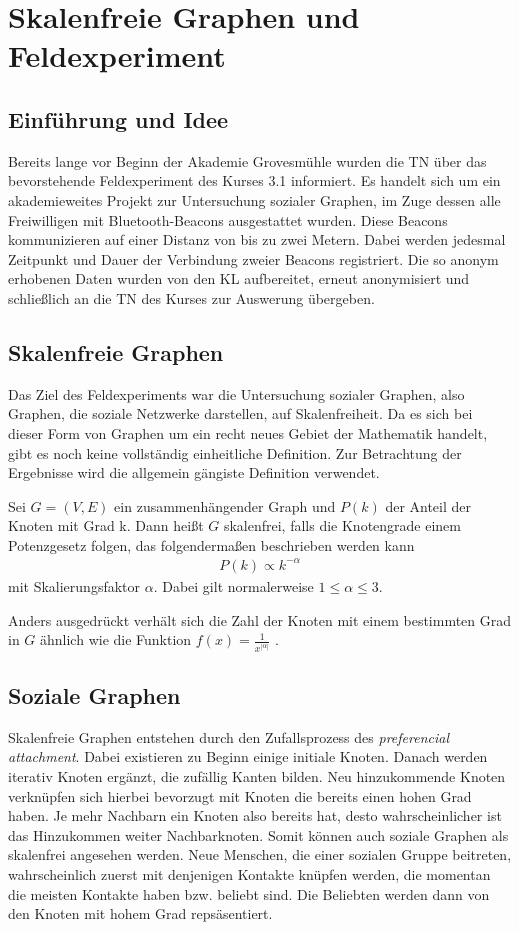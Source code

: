 \section{Skalenfreie Graphen und Feldexperiment}
\subsection{Einführung und Idee}
Bereits lange vor Beginn der Akademie Grovesmühle wurden die TN über das bevorstehende Feldexperiment des Kurses 3.1 informiert. Es handelt sich um ein akademieweites Projekt zur Untersuchung sozialer Graphen, im Zuge dessen alle Freiwilligen mit Bluetooth-Beacons ausgestattet wurden. Diese Beacons kommunizieren auf einer Distanz von bis zu zwei Metern. Dabei werden jedesmal Zeitpunkt und Dauer der Verbindung zweier Beacons registriert. Die so anonym erhobenen Daten wurden von den KL aufbereitet, erneut anonymisiert und schließlich an die TN des Kurses zur Auswerung übergeben.
\subsection{Skalenfreie Graphen}
Das Ziel des Feldexperiments war die Untersuchung sozialer Graphen, also Graphen, die soziale Netzwerke darstellen, auf Skalenfreiheit. Da es sich bei dieser Form von Graphen um ein recht neues Gebiet der Mathematik handelt, gibt es noch keine vollständig einheitliche Definition. Zur Betrachtung der Ergebnisse wird die allgemein gängiste Definition verwendet.
\begin{df} Sei $G=(V,E)$ ein zusammenhängender Graph und $P(k)$ der Anteil der Knoten mit Grad k. Dann heißt $G$ skalenfrei, falls die Knotengrade einem Potenzgesetz folgen, das folgendermaßen beschrieben werden kann
\begin{align*}
P(k) \varpropto k^{-\alpha}
\end{align*}
mit Skalierungsfaktor $\alpha$. Dabei gilt normalerweise $1\leq\alpha\leq3$.
\end{df}
Anders ausgedrückt verhält sich die Zahl der Knoten mit einem bestimmten Grad in $G$ ähnlich wie die Funktion $f(x) = \frac{1}{x^{|\alpha|}}$ .
\subsection{Soziale Graphen}
Skalenfreie Graphen entstehen durch den Zufallsprozess des \textit{preferencial attachment}. Dabei existieren zu Beginn einige initiale Knoten. Danach werden iterativ Knoten ergänzt, die zufällig Kanten bilden. Neu hinzukommende Knoten verknüpfen sich hierbei bevorzugt mit Knoten die bereits einen hohen Grad haben. Je mehr Nachbarn ein Knoten also bereits hat, desto wahrscheinlicher ist das Hinzukommen weiter Nachbarknoten. Somit können auch soziale Graphen als skalenfrei angesehen werden. Neue Menschen, die einer sozialen Gruppe beitreten, wahrscheinlich zuerst mit denjenigen Kontakte knüpfen werden, die momentan die meisten Kontakte haben bzw. beliebt sind. Die Beliebten werden dann von den Knoten mit hohem Grad repsäsentiert.
